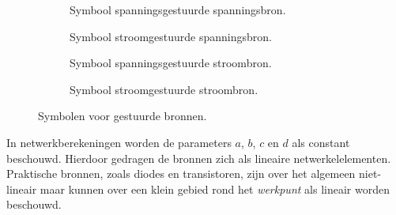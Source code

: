 \begin{figure}[!ht]
\centering
\begin{subfigure}{0.23\textwidth}
\centering
{}
\caption{Symbool spanningsgestuurde spanningsbron.}
\label{fig:gelsymbolengestuuurdebronnenen2vcvs}
\end{subfigure}
\begin{subfigure}{0.23\textwidth}
\centering
{}
\caption{Symbool stroomgestuurde spanningsbron.}
\label{fig:gelsymbolengestuuurdebronnenen2ccvs}
\end{subfigure}
\begin{subfigure}{0.23\textwidth}
\centering
{}
\caption{Symbool spanningsgestuurde stroombron.}
\label{fig:gelsymbolengestuuurdebronnenen2vccs}
\end{subfigure}
\begin{subfigure}{0.23\textwidth}
\centering
{}
\caption{Symbool stroomgestuurde stroombron.}
\label{fig:gelsymbolengestuuurdebronnenen2cccs}
\end{subfigure}
\caption{Symbolen voor gestuurde bronnen.}
\label{fig:gelsymbolengestuuurdebronnenen2}
\end{figure}

In netwerkberekeningen worden de parameters $a$, $b$, $c$ en $d$ als constant beschouwd. Hierdoor gedragen de bronnen zich als lineaire netwerkelelementen. Praktische bronnen, zoals diodes en transistoren, zijn over het algemeen niet-lineair maar kunnen over een klein gebied rond het \textsl{werkpunt} als lineair worden beschouwd.

